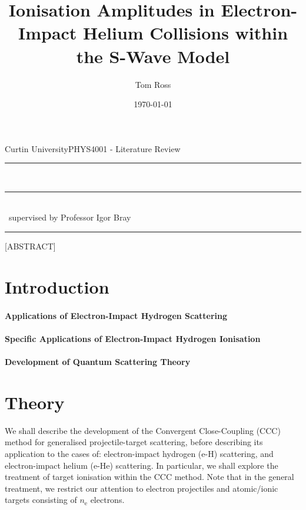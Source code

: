 \documentclass[draft]{article}
\title{Ionisation Amplitudes in Electron-Impact Helium Collisions within the
  S-Wave Model}
\author{Tom Ross}
\date{\today}
\gdef\theassessment{PHYS4001 - Literature Review}
\gdef\thesupervisor{Professor Igor Bray}
\gdef\theinstitution{Curtin University}
\begin{document}

\begin{titlepage}
  \begin{flushleft}
    \theinstitution \hfill \theassessment
  \end{flushleft}
  \hrule
  \begin{center}
    {
      \huge
      \thetitle
    }
    ~\\
    \rule[1.0pt]{8.5cm}{0.4pt}
    ~\\
    {
      \large
      \theauthor ~supervised by \thesupervisor
    }
  \end{center}
  \hrule
  \begin{center}
    [ABSTRACT]
  \end{center}
\end{titlepage}

\clearpage


\tableofcontents

\listoffigures

\listoftables


\clearpage

\section{Introduction}
\label{sec:introduction}

\paragraph{Applications of Electron-Impact Hydrogen Scattering}

\paragraph{Specific Applications of Electron-Impact Hydrogen Ionisation}

\paragraph{Development of Quantum Scattering Theory}

\section{Theory}
\label{sec:theory}

We shall describe the development of the Convergent Close-Coupling (CCC) method
for generalised projectile-target scattering, before describing its application
to the cases of: electron-impact hydrogen (e-H) scattering, and electron-impact
helium (e-He) scattering.
In particular, we shall explore the treatment of target ionisation within the CCC
method.
Note that in the general treatment, we restrict our attention to electron
projectiles and atomic/ionic targets consisting of $n_{\mathrm{e}}$ electrons.
\end{document}

